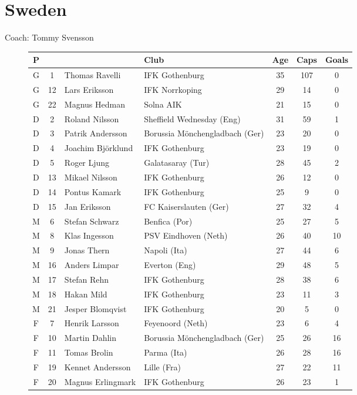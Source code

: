 \chapter{Sweden}
\newline
\newline
Coach: Tommy Svensson
\begin{figure}[H]
\begin{tabular}{c c l l c c c}
P & & & Club & Age & Caps & Goals \\ \hline
G & 1 & Thomas Ravelli & IFK Gothenburg & 35 & 107 & 0 \\
G & 12 & Lars Eriksson & IFK Norrkoping & 29 & 14 & 0 \\
G & 22 & Magnus Hedman & Solna AIK & 21 & 15 & 0 \\ \hline
D & 2 & Roland Nilsson & Sheffield Wednesday (Eng) & 31 & 59 & 1 \\
D & 3 & Patrik Andersson & Borussia M{\"o}nchengladbach (Ger) & 23 & 20 & 0 \\
D & 4 & Joachim Bj{\"o}rklund & IFK Gothenburg & 23 & 19 & 0 \\
D & 5 & Roger Ljung & Galatasaray (Tur) & 28 & 45 & 2 \\
D &13 & Mikael Nilsson & IFK Gothenburg & 26 & 12 & 0 \\
D &14 & Pontus Kamark & IFK Gothenburg & 25 & 9 & 0 \\
D &15 & Jan Eriksson & FC Kaiserslauten (Ger) & 27 & 32 & 4 \\ \hline
M & 6 & Stefan Schwarz & Benfica (Por) & 25 & 27 & 5 \\
M & 8 & Klas Ingesson & PSV Eindhoven (Neth) & 26 & 40 & 10 \\
M & 9 & Jonas Thern & Napoli (Ita) & 27 & 44 & 6 \\
M & 16 & Anders Limpar & Everton (Eng) & 29 & 48 & 5 \\
M & 17 & Stefan Rehn & IFK Gothenburg & 28 & 38 & 6 \\
M & 18 & Hakan Mild & IFK Gothenburg & 23 & 11 & 3 \\
M & 21 & Jesper Blomqvist & IFK Gothenburg & 20 & 5 & 0 \\ \hline
F & 7 & Henrik Larsson & Feyenoord (Neth) & 23 & 6 & 4 \\
F & 10 & Martin Dahlin & Borussia M{\"o}nchengladbach (Ger) & 25 & 26 & 16 \\
F & 11 & Tomas Brolin & Parma (Ita) & 26 & 28 & 16 \\
F & 19 & Kennet Andersson & Lille (Fra) & 27 & 22 & 11 \\
F & 20 & Magnus Erlingmark & IFK Gothenburg & 26 & 23 & 1 \\ \hline
\end{tabular}
\end{figure}
